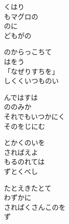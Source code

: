 \documentclass[10pt,b5j]{tarticle} %
\begin{document}
\begin{enumerate}
\begin{minipage}[c]{\blocksize}
        \vspace{\linespace}
        \item
        くはり\\
        もマグロの\\
        のに\\
        どもがの
        
        \vspace{\linespace}
        \item
        のからっこちて\\
        はをう\\
        「なぜりすちを」\\
        しくくいつものい
        
        \vspace{\linespace}
        \item
        んではすは\\
        ののみか\\
        それでもいつかにく\\
        そのをじにむ
        
        \vspace{\linespace}
        \item
        とかくのいを\\
        さればえよ\\
        もるのれては\\
        ずとくべし
        
        \vspace{\linespace}
        \item
        たとえきたとて\\
        わずかに\\
        さればくさんこのを\\
        ず
    
    \end{minipage}
\end{enumerate} %
\end{document}
